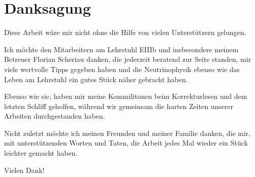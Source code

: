 \newpage
\section*{Danksagung} %
\label{sec:danksagung}
Diese Arbeit wäre mir nicht ohne die Hilfe von vielen Unterstützern gelungen.



Ich möchte den Mitarbeitern am Lehrstuhl EIIIb und insbesondere meinem Betreuer Florian Scheriau danken, die jederzeit beratend zur Seite standen, mir viele wertvolle Tipps gegeben haben und die Neutrinophysik ebenso wie das Leben am Lehrstuhl ein gutes Stück näher gebracht haben.

Ebenso wie sie, haben mir meine Kommilitonen beim Korrekturlesen und dem letzten Schliff geholfen, während wir gemeinsam die harten Zeiten unserer Arbeiten durchgestanden haben.

Nicht zuletzt möchte ich meinen Freunden und meiner Familie danken, die mir, mit unterstützenden Worten und Taten, die Arbeit jedes Mal wieder ein Stück leichter gemacht haben.

Vielen Dank!
